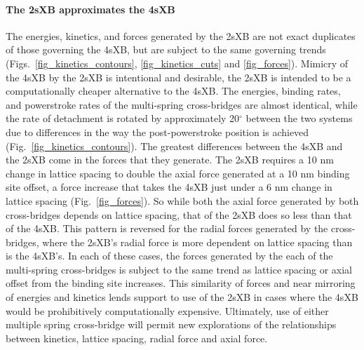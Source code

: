 \documentclass[]{article}
\begin{document}
\paragraph{The 2sXB approximates the 4sXB} %
The energies, kinetics, and forces generated by the 2sXB are not exact duplicates of those governing the 4sXB, but are subject to the same governing trends (Figs.~\ref{fig_kinetics_contours}, \ref{fig_kinetics_cuts} and \ref{fig_forces}). 
Mimicry of the 4sXB by the 2sXB is intentional and desirable, the 2sXB is intended to be a computationally cheaper alternative to the 4sXB. 
The energies, binding rates, and powerstroke rates of the multi-spring cross-bridges are almost identical, while the rate of detachment is rotated by approximately 20$^\circ$ between the two systems due to differences in the way the post-powerstroke position is achieved (Fig.~\ref{fig_kinetics_contours}).
The greatest differences between the 4sXB and the 2sXB come in the forces that they generate.
The 2sXB requires a 10 nm change in lattice spacing to double the axial force generated at a 10 nm binding site offset, a force increase that takes the 4sXB just under a 6 nm change in lattice spacing (Fig.~\ref{fig_forces}). 
So while both the axial force generated by both cross-bridges depends on lattice spacing, that of the 2sXB does so less than that of the 4sXB.
This pattern is reversed for the radial forces generated by the cross-bridges, where the 2sXB's radial force is more dependent on lattice spacing than is the 4sXB's.
In each of these cases, the forces generated by the each of the multi-spring cross-bridges is subject to the same trend as lattice spacing or axial offset from the binding site increases.
This similarity of forces and near mirroring of energies and kinetics lends support to use of the 2sXB in cases where the 4sXB would be prohibitively computationally expensive.
Ultimately, use of either multiple spring cross-bridge will permit new explorations of the relationships between kinetics, lattice spacing, radial force and axial force.
\end{document}
